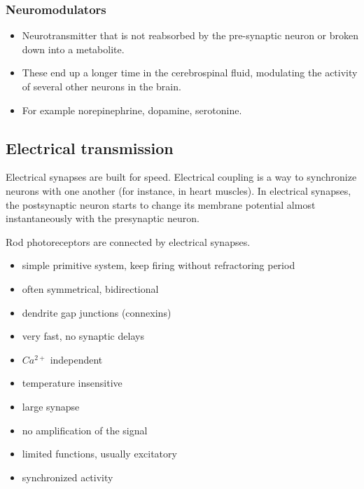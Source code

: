 \documentclass[main]{subfiles}
\begin{document}
\subsubsection{Neuromodulators}
\begin{itemize}[noitemsep,nolistsep]
	\item Neurotransmitter that is not reabsorbed by the pre-synaptic neuron or broken down into a metabolite.
	\item These end up a longer time in the cerebrospinal fluid, modulating the activity of several other neurons in the brain.
	\item For example norepinephrine, dopamine, serotonine.
\end{itemize}

\subsection{Electrical transmission}
Electrical synapses are built for speed. Electrical coupling is a way to synchronize neurons with one another (for instance, in heart muscles). In electrical synapses, the postsynaptic neuron starts to change its membrane potential almost instantaneously with the presynaptic neuron.

Rod photoreceptors are connected by electrical synapses.

\begin{itemize}
\item simple primitive system, keep firing without refractoring period
\item often symmetrical, bidirectional
\item dendrite gap junctions (connexins)
\item very fast, no synaptic delays
\item $Ca^{2+}$ independent
\item temperature insensitive
\item large synapse
\item no amplification of the signal
\item limited functions, usually excitatory
\item synchronized activity
\end{itemize}
\end{document}
